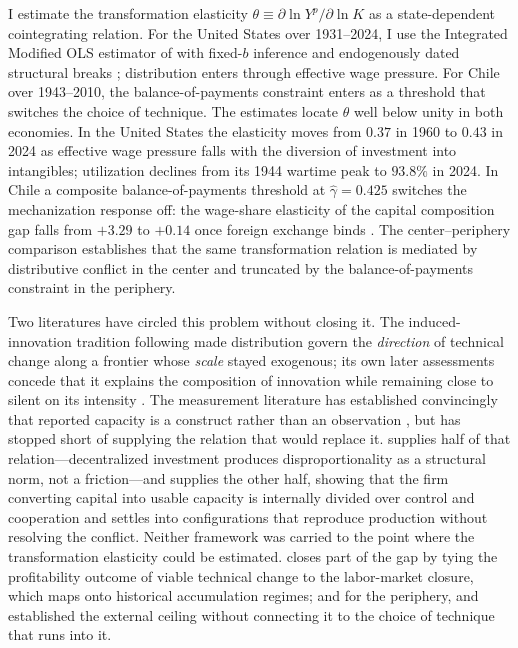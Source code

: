 I estimate the transformation elasticity $\theta \equiv \partial \ln
Y^p / \partial \ln K$ as a state-dependent cointegrating relation.
For the United States over 1931--2024, I use the Integrated Modified
OLS estimator of \citet{VogelsangWagner2024} with fixed-$b$ inference
and endogenously dated structural breaks \citep{BaiPerron2003};
distribution enters through effective wage pressure. For Chile over
1943--2010, the balance-of-payments constraint enters as a threshold
that switches the choice of technique. The estimates locate $\theta$
well below unity in both economies. In the United States the elasticity
moves from $0.37$ in 1960 to $0.43$ in 2024 as effective wage
pressure falls with the diversion of investment into intangibles;
utilization declines from its 1944 wartime peak to $93.8\%$ in 2024.
In Chile a composite balance-of-payments threshold at
$\hat{\gamma} = 0.425$ switches the mechanization response off: the
wage-share elasticity of the capital composition gap falls from $+3.29$
to $+0.14$ once foreign exchange binds \citep{Hansen2000}. The
center--periphery comparison establishes that the same transformation
relation is mediated by distributive conflict in the center and
truncated by the balance-of-payments constraint in the periphery.

Two literatures have circled this problem without closing it. The
induced-innovation tradition following \citet{Kennedy1964} made
distribution govern the \emph{direction} of technical change along a
frontier whose \emph{scale} stayed exogenous; its own later assessments
concede that it explains the composition of innovation while remaining
close to silent on its intensity \citep{TavaniZamparelli2018}. The
measurement literature has established convincingly that reported
capacity is a construct rather than an observation
\citep{Shaikh2016, Nikiforos2016}, but has stopped short of supplying
the relation that would replace it. \citet{Okishio1961, Okishio2022}
supplies half of that relation---decentralized investment produces
disproportionality as a structural norm, not a friction---and
\citet{Vidal2022, Vidal2019} supplies the other half, showing that the
firm converting capital into usable capacity is internally divided
over control and cooperation and settles into configurations that
reproduce production without resolving the conflict. Neither framework
was carried to the point where the transformation elasticity could be
estimated. \citet{Basu2022, Basu2026} closes part of the gap by tying
the profitability outcome of viable technical change to the
labor-market closure, which maps onto historical accumulation regimes;
and for the periphery, \citet{Prebisch1981} and \citet{Kaldor1959}
established the external ceiling without connecting it to the choice of
technique that runs into it.


